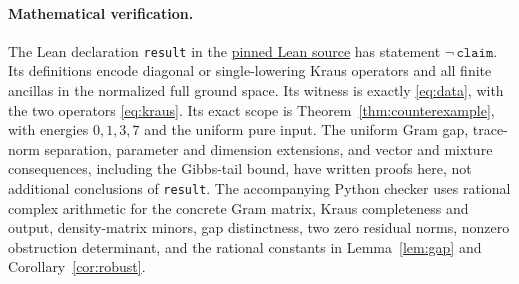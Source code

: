 \documentclass[11pt]{article}
\begin{document}
\paragraph{Mathematical verification.}
The Lean declaration \texttt{result} in the
\href{https://github.com/the-omega-institute/trureturing/blob/0eae8e045cb2ba958e2097dbac034f62f9c1dd7a/D5/S3/QuantumChannels/CoolingMapThermalOperationRefutation.lean}{pinned Lean source}
has statement $\neg\,\texttt{claim}$. Its definitions encode diagonal or
single-lowering Kraus operators and all finite ancillas in the normalized
full ground space. Its witness is exactly \eqref{eq:data}, with the two
operators \eqref{eq:kraus}. Its exact scope is Theorem~\ref{thm:counterexample},
with energies $0,1,3,7$ and the uniform pure input. The uniform Gram gap,
trace-norm separation, parameter and dimension extensions, and vector and
mixture consequences, including the Gibbs-tail bound, have written proofs
here, not additional conclusions
of \texttt{result}. The accompanying Python
checker uses rational complex arithmetic for the concrete Gram matrix,
Kraus completeness and output, density-matrix minors, gap distinctness,
two zero residual norms, nonzero obstruction determinant, and the rational
constants in Lemma~\ref{lem:gap} and Corollary~\ref{cor:robust}.
\end{document}
